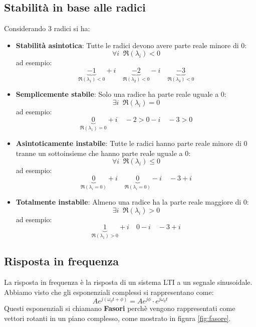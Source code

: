 \documentclass[a4paper]{article}
\begin{document}
\subsection{Stabilità in base alle radici}
Considerando 3 radici si ha:
\begin{itemize}
  \item \textbf{Stabilità asintotica}: Tutte le radici devono avere parte reale minore
    di 0:
    \[
    \forall i \;\; \Re(\lambda_i) < 0
    \] 
    ad esempio:
    \[
      \underbrace{-1}_{\Re(\lambda_1) < 0} + i \quad
      \underbrace{-2}_{\Re(\lambda_2) < 0} - i \quad
      \underbrace{-3}_{\Re(\lambda_3) < 0}
    \] 

  \item \textbf{Semplicemente stabile}: Solo una radice ha parte reale uguale a 0: 
    \[
    \exists i \;\; \Re(\lambda_i) = 0
    \] 
    ad esempio:
    \[
      \underbrace{0}_{\Re(\lambda_1) = 0} + i \quad
      -2 > 0 - i \quad
      -3 > 0
    \]

  \item \textbf{Asintoticamente instabile}: Tutte le radici hanno parte reale minore di
    0 tranne un sottoinsieme che hanno parte reale uguale a 0:
    \[
    \forall i \;\; \Re(\lambda_i) \le 0
    \] 
    ad esempio:
    \[
      \underbrace{0}_{\Re(\lambda_i = 0)} + i \quad
      \underbrace{0}_{\Re(\lambda_i = 0)} - i \quad
      -3 + i
    \]

  \item \textbf{Totalmente instabile}: Almeno una radice ha la parte reale maggiore di 0:
    \[
    \exists i \;\; \Re(\lambda_i) > 0
    \] 
    ad esempio:
    \[
      \underbrace{1}_{\Re(\lambda_1) > 0} + i \quad
      0 - i \quad
      -3 + i
    \]
\end{itemize}

\subsection{Risposta in frequenza}
La risposta in frequenza è la risposta di un sistema LTI a un segnale sinusoidale.
Abbiamo visto che gli esponenziali complessi si rappresentano come:
\[
  Ae^{j \left( \omega_0 t + \phi \right)} = A e^{j \phi} \cdot e^{j \omega_0 t}
\] 
Questi esponenziali si chiamano \textbf{Fasori} perchè vengono rappresentati come
vettori rotanti in un piano complesso, come mostrato in figura \ref{fig:fasore}.
\end{document}
